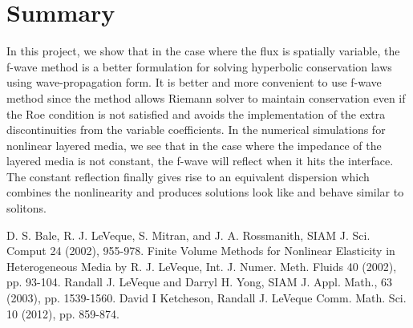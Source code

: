 \documentclass{article}
\begin{document}
\section{Summary}
In this project, we show that in the case where the flux is spatially variable, the f-wave method is a better formulation for solving hyperbolic conservation laws using wave-propagation form. It is better and more convenient to use f-wave method since the method allows Riemann solver to maintain conservation even if the Roe condition is not satisfied and avoids the implementation of the extra discontinuities from the variable coefficients. In the numerical simulations for nonlinear layered media, we see that in the case where the impedance of the layered media is not constant, the f-wave will reflect when it hits the interface. The constant reflection finally gives rise to an equivalent dispersion which combines the nonlinearity and produces solutions look like and behave similar to solitons.

\begin{thebibliography}{9}
D. S. Bale, R. J. LeVeque, S. Mitran, and J. A. Rossmanith, SIAM J. Sci. Comput 24 (2002), 955-978.
Finite Volume Methods for Nonlinear Elasticity in Heterogeneous Media
by R. J. LeVeque, Int. J. Numer. Meth. Fluids 40 (2002), pp. 93-104.
Randall J. LeVeque and Darryl H. Yong, SIAM J. Appl. Math., 63 (2003), pp. 1539-1560.
David I Ketcheson, Randall J. LeVeque Comm. Math. Sci. 10 (2012), pp. 859-874.

\end{thebibliography}
\end{document}
